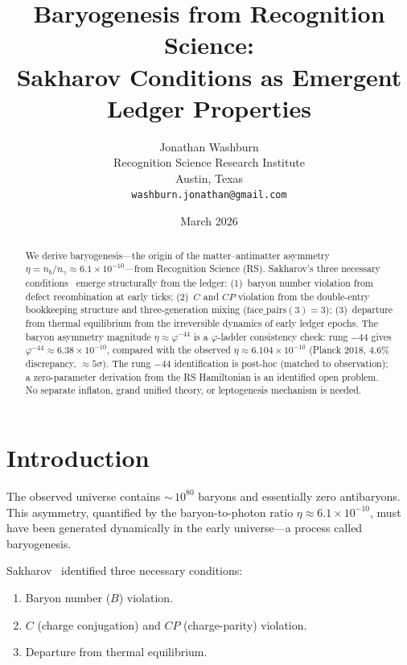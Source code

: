 \documentclass[12pt,a4paper]{article}
\title{Baryogenesis from Recognition Science:\\
Sakharov Conditions as Emergent Ledger Properties}
\author{Jonathan Washburn\\
Recognition Science Research Institute\\
Austin, Texas\\
\texttt{washburn.jonathan@gmail.com}}
\date{March 2026}
\theoremstyle{definition}
\theoremstyle{remark}
\begin{document}
\maketitle

\begin{abstract}
We derive baryogenesis---the origin of the matter--antimatter
asymmetry $\eta = n_b/n_\gamma \approx 6.1 \times 10^{-10}$---from
Recognition Science (RS).  Sakharov's three necessary
conditions~\cite{Sakharov1967} emerge structurally from the ledger:
(1)~baryon number violation from defect recombination at early ticks;
(2)~$C$ and $CP$ violation from the double-entry bookkeeping
structure and three-generation mixing
($\mathrm{face\_pairs}(3) = 3$); (3)~departure from thermal
equilibrium from the irreversible dynamics of early ledger epochs.
The baryon asymmetry magnitude $\eta \approx \varphi^{-44}$ is a
$\varphi$-ladder consistency check: rung $-44$ gives
$\varphi^{-44} \approx 6.38 \times 10^{-10}$, compared with the
observed $\eta \approx 6.104 \times 10^{-10}$ (Planck 2018,
$4.6\%$ discrepancy, $\approx 5\sigma$).  The rung $-44$
identification is post-hoc (matched to observation); a
zero-parameter derivation from the RS Hamiltonian is an identified
open problem.  No separate inflaton, grand unified theory, or
leptogenesis mechanism is needed.
\end{abstract}

\section{Introduction}
\label{sec:intro}

The observed universe contains ${\sim}\,10^{80}$ baryons and
essentially zero antibaryons.  This asymmetry, quantified by the
baryon-to-photon ratio $\eta \approx 6.1 \times 10^{-10}$, must
have been generated dynamically in the early universe---a process
called baryogenesis.

Sakharov~\cite{Sakharov1967} identified three necessary conditions:
\begin{enumerate}
  \item Baryon number ($B$) violation.
  \item $C$ (charge conjugation) and $CP$ (charge-parity) violation.
  \item Departure from thermal equilibrium.
\end{enumerate}
\end{document}
